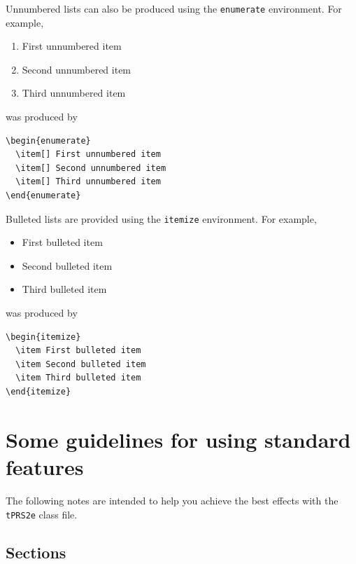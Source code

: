 \documentclass{tPRS2e}
\begin{document}
Unnumbered lists can also be produced using the \texttt{enumerate} environment. For example,
\begin{enumerate}
  \item[] First unnumbered item
  \item[] Second unnumbered item
  \item[] Third unnumbered item
\end{enumerate}
was produced by
\begin{verbatim}
\begin{enumerate}
  \item[] First unnumbered item
  \item[] Second unnumbered item
  \item[] Third unnumbered item
\end{enumerate}
\end{verbatim}

Bulleted lists are provided using the \texttt{itemize} environment. For example,
\begin{itemize}
  \item First bulleted item
  \item Second bulleted item
  \item Third bulleted item
\end{itemize}
was produced by
\begin{verbatim}
\begin{itemize}
  \item First bulleted item
  \item Second bulleted item
  \item Third bulleted item
\end{itemize}
\end{verbatim}


\section{Some guidelines for using standard features}

The following notes are intended to help you achieve the best effects with the \texttt{tPRS2e} class file.


\subsection{Sections}
\end{document}
